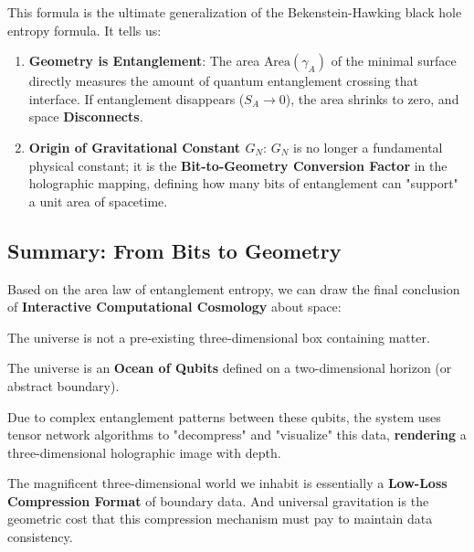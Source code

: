 This formula is the ultimate generalization of the Bekenstein-Hawking black hole entropy formula. It tells us:

\begin{enumerate}
\item \textbf{Geometry is Entanglement}: The area $\text{Area}(\gamma_A)$ of the minimal surface directly measures the amount of quantum entanglement crossing that interface. If entanglement disappears ($S_A \to 0$), the area shrinks to zero, and space \textbf{Disconnects}.

\item \textbf{Origin of Gravitational Constant $G_N$}: $G_N$ is no longer a fundamental physical constant; it is the \textbf{Bit-to-Geometry Conversion Factor} in the holographic mapping, defining how many bits of entanglement can "support" a unit area of spacetime.
\end{enumerate}

\subsection{Summary: From Bits to Geometry}

Based on the area law of entanglement entropy, we can draw the final conclusion of \textbf{Interactive Computational Cosmology} about space:

The universe is not a pre-existing three-dimensional box containing matter.

The universe is an \textbf{Ocean of Qubits} defined on a two-dimensional horizon (or abstract boundary).

Due to complex entanglement patterns between these qubits, the system uses tensor network algorithms to "decompress" and "visualize" this data, \textbf{rendering} a three-dimensional holographic image with depth.

The magnificent three-dimensional world we inhabit is essentially a \textbf{Low-Loss Compression Format} of boundary data. And universal gravitation is the geometric cost that this compression mechanism must pay to maintain data consistency.

